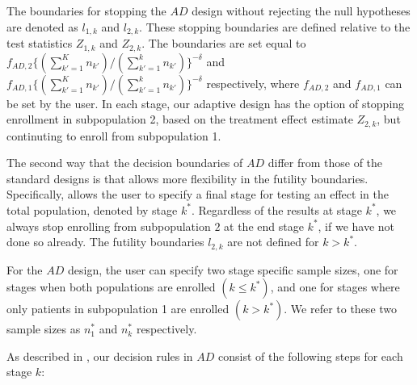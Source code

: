 \documentclass[article]{jss}
\begin{document}
The boundaries for stopping the $AD$ design without rejecting the null hypotheses are denoted as $l_{1,k}$ and $l_{2,k}$. These stopping boundaries are defined relative to the test statistics $Z_{1,k}$ and $Z_{2,k}$. The boundaries are set equal to $f_{AD,2}\{(\sum_{k'=1}^{K} n_{k'})/(\sum_{k'=1}^{k}n_{k'})\}^{-δ}$ and $f_{AD,1}\{(\sum_{k'=1}^{K} n_{k'})/(\sum_{k'=1}^{k}n_{k'})\}^{-δ}$ respectively, where $f_{AD,2}$ and $f_{AD,1}$ can be set by the user. In each stage, our adaptive design has the option of stopping enrollment in subpopulation 2, based on the treatment effect estimate $Z_{2,k}$, but continuting to enroll from subpopulation 1. 

The second way that the decision boundaries of $AD$ differ from those of the standard designs is that  allows more flexibility in the futility boundaries.  Specifically,  allows the user to specify a final stage for testing an effect in the total population, denoted by stage $k^*$. Regardless of the results at stage $k^*$, we always stop enrolling from subpopulation $2$ at the end stage $k^*$, if we have not done so already. The futility boundaries $l_{2,k}$ are not defined for $k>k^*$.


For the $AD$ design, the user can specify two stage specific sample sizes, one for stages when both populations are enrolled $(k \leq k^*)$, and one for stages where only patients in subpopulation 1 are enrolled $(k > k^*)$. We refer to these two sample sizes as $n_1^*$ and $n_k^*$ respectively.

As described in \citep{Rosenblum2013AdaptMISTIE}, our decision rules in $AD$ consist of the following steps for each stage $k$:
\end{document}
